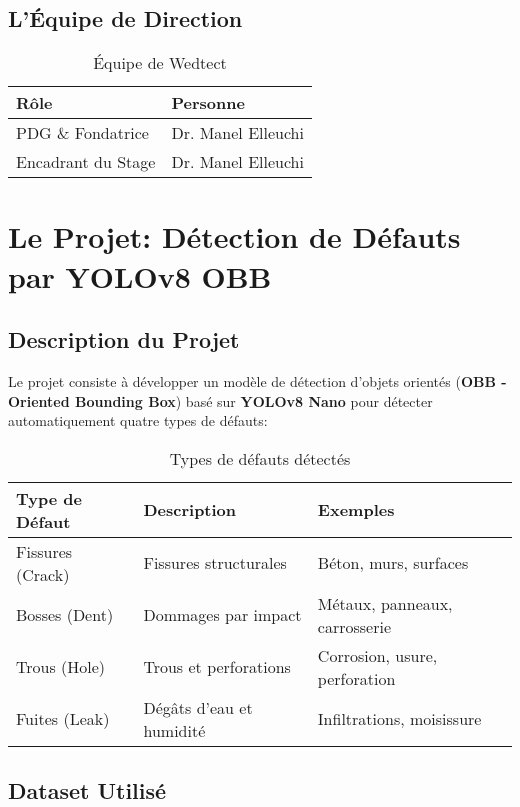 \documentclass[a4paper,12pt]{report}
\begin{document}
\subsection{L'Équipe de Direction}

\begin{table}[H]
    \centering
    \begin{tabular}{|l|l|}
    \hline
    \textbf{Rôle} & \textbf{Personne} \\
    \hline
    PDG \& Fondatrice & Dr. Manel Elleuchi \\
    \hline
    Encadrant du Stage & Dr. Manel Elleuchi \\
    \hline
    \end{tabular}
    \caption{Équipe de Wedtect}
\end{table}

\section{Le Projet: Détection de Défauts par YOLOv8 OBB}

\subsection{Description du Projet}

Le projet consiste à développer un modèle de détection d'objets orientés (\textbf{OBB - Oriented Bounding Box}) basé sur \textbf{YOLOv8 Nano} pour détecter automatiquement quatre types de défauts:

\begin{table}[H]
    \centering
    \begin{tabular}{|l|l|l|}
    \hline
    \textbf{Type de Défaut} & \textbf{Description} & \textbf{Exemples} \\
    \hline
    Fissures (Crack) & Fissures structurales & Béton, murs, surfaces \\
    \hline
    Bosses (Dent) & Dommages par impact & Métaux, panneaux, carrosserie \\
    \hline
    Trous (Hole) & Trous et perforations & Corrosion, usure, perforation \\
    \hline
    Fuites (Leak) & Dégâts d'eau et humidité & Infiltrations, moisissure \\
    \hline
    \end{tabular}
    \caption{Types de défauts détectés}
\end{table}

\subsection{Dataset Utilisé}
\end{document}
